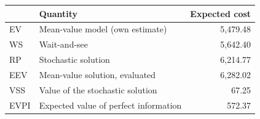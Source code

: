 \begin{tabular}{llr}
\toprule
 & Quantity & Expected cost \\
\midrule
EV & Mean-value model (own estimate) & 5,479.48 \\
WS & Wait-and-see & 5,642.40 \\
RP & Stochastic solution & 6,214.77 \\
EEV & Mean-value solution, evaluated & 6,282.02 \\
VSS & Value of the stochastic solution & 67.25 \\
EVPI & Expected value of perfect information & 572.37 \\
\bottomrule
\end{tabular}
